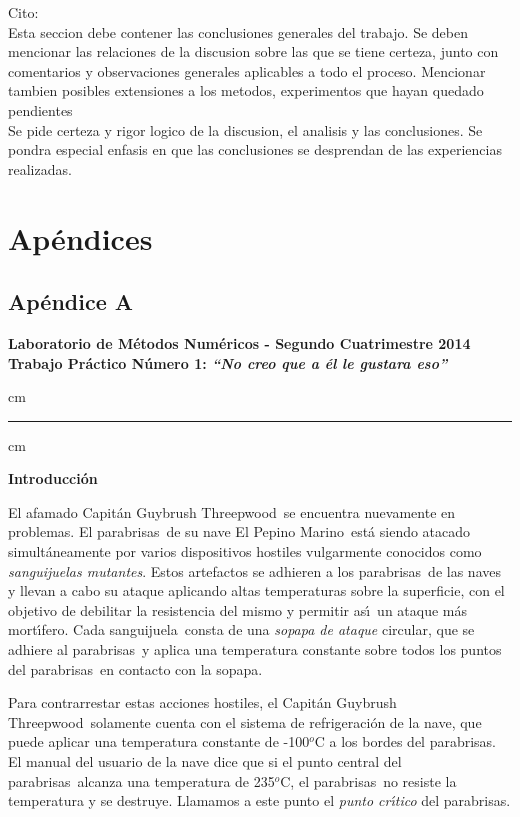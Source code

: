 \documentclass[double, 1.5in, 12pt]{beavtex}
\newcommand{\atacante}{sanguijuela}
\newcommand{\capitan}{Capit\'an Guybrush Threepwood}
\newcommand{\objeto}{parabrisas}
\newcommand{\nave}{El Pepino Marino}
\begin{document}
Cito: \\

Esta seccion debe contener las conclusiones generales del trabajo. Se deben mencionar
las relaciones de la discusion sobre las que se tiene certeza, junto con comentarios
y observaciones generales aplicables a todo el proceso. Mencionar tambien posibles
extensiones a los metodos, experimentos que hayan quedado pendientes\\
Se pide certeza y rigor logico de la discusion, el analisis y las conclusiones. Se pondra especial
enfasis en que las conclusiones se desprendan de las experiencias realizadas. 



\chapter{Ap\'endices}

\section{Ap\'endice A}


\begin{centering}
\large\bf Laboratorio de M\'etodos Num\'ericos - Segundo Cuatrimestre 2014 \\
\large\bf Trabajo Pr\'actico N\'umero 1: \emph{``No creo que a \'el le gustara eso''}\\
\end{centering}


 cm
\hrule
{} cm

{\noindent \bf Introducci\'on}

El afamado \capitan\ se encuentra nuevamente en problemas. El
\objeto\ de su nave \nave\ est\'a siendo atacado simult\'aneamente por varios
dispositivos hostiles vulgarmente conocidos como \emph{\atacante s
mutantes}. Estos artefactos se adhieren a los \objeto\ de las naves y
llevan a cabo su ataque aplicando altas temperaturas sobre la superficie, con
el objetivo de debilitar la resistencia del mismo y permitir as\'\i \
un ataque m\'as mort\'\i fero. Cada \atacante\ consta de una \emph{sopapa
de ataque} circular, que se adhiere al \objeto\ y aplica una temperatura
constante sobre todos los puntos del \objeto\ en contacto con la sopapa.

Para con\-tra\-rres\-tar estas acciones hostiles, el \capitan\ 
solamente cuenta con el sistema de refrigeraci\'on de la nave, que puede
aplicar una temperatura constante de -100${}^o$C a los bordes del \objeto.
El manual del usuario de la nave dice que si el punto central del \objeto\ 
alcanza una temperatura de 235${}^o$C, el \objeto\ no resiste la temperatura
y se destruye. Llamamos a este punto el \emph{punto cr\'\i tico} del
\objeto.
\end{document}
